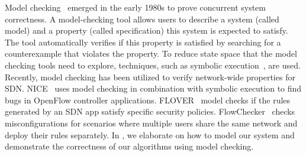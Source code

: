 Model checking~\cite{modelcheck} emerged in the early 1980s to prove concurrent system correctness. A model-checking tool allows users to describe a system (called model) and a property (called specification) this system is expected to satisfy. The tool automatically verifies if this property is satisfied by searching for a counterexample that violates the property. To reduce state space that the model checking tools need to explore, techniques, such as symbolic execution~\cite{symbolic}, are used. Recently, model checking has been utilized to verify network-wide properties for SDN. NICE~\cite{nice} uses model checking in combination with symbolic execution to find bugs in OpenFlow controller applications. FLOVER~\cite{mcopenflow} model checks if the rules generated by an SDN app satisfy specific security policies. FlowChecker~\cite{flowchecker} checks misconfigurations for scenarios where multiple users share the same network and deploy their rules separately. In , we elaborate on how to model our system and demonstrate the correctness of our algorithms using model checking.



  